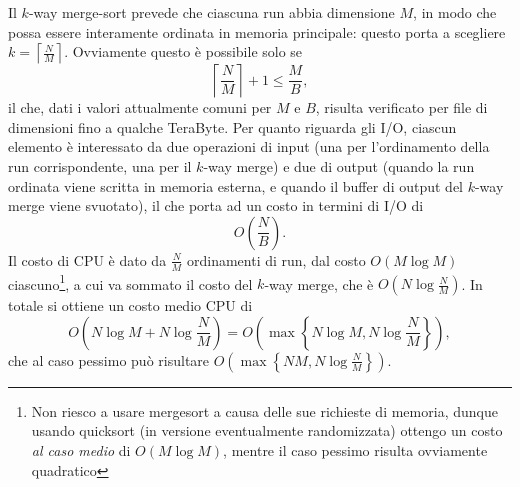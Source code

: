\[\]
Il $k$-way merge-sort prevede che ciascuna run abbia dimensione $M$, in modo che possa essere interamente ordinata in memoria principale: questo porta a scegliere $k=\left\lceil\frac{N}{M}\right\rceil$. Ovviamente questo è possibile solo se \[\left\lceil\frac{N}{M}\right\rceil + 1 \le \frac{M}{B},\] il che, dati i valori attualmente comuni per $M$ e $B$, risulta verificato per file di dimensioni fino a qualche TeraByte.\newline
Per quanto riguarda gli I/O, ciascun elemento è interessato da due operazioni di input (una per l'ordinamento della run corrispondente, una per il $k$-way merge) e due di output (quando la run ordinata viene scritta in memoria esterna, e quando il buffer di output del $k$-way merge viene svuotato), il che porta ad un costo in termini di I/O di \[O\left(\frac{N}{B}\right).\] \newline
Il costo di CPU è dato da $\frac{N}{M}$ ordinamenti di run, dal costo $O(M \log M)$ ciascuno\footnote{Non riesco a usare mergesort a causa delle sue richieste di memoria, dunque usando quicksort (in versione eventualmente randomizzata) ottengo un costo \textit{al caso medio} di $O(M \log M)$, mentre il caso pessimo risulta ovviamente quadratico}, a cui va sommato il costo del $k$-way merge, che è $O(N\log\frac{N}{M})$. In totale si ottiene un costo medio CPU di \[O\left(N\log M + N\log\frac{N}{M}\right) = O\left(\max\left\{N\log M, N\log\frac{N}{M}\right\}\right),\]che al caso pessimo può risultare $\displaystyle O\left(\max\left\{NM, N\log\frac{N}{M}\right\}\right)$.

